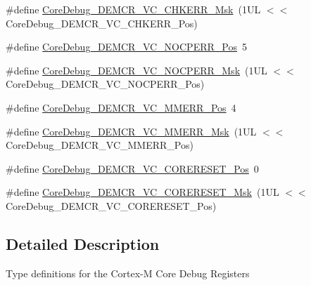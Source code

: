 \begin{DoxyCompactItemize}
\item 
\#define \hyperlink{group___c_m_s_i_s___core_debug_ga2f98b461d19746ab2febfddebb73da6f}{Core\-Debug\-\_\-\-D\-E\-M\-C\-R\-\_\-\-V\-C\-\_\-\-C\-H\-K\-E\-R\-R\-\_\-\-Msk}~(1\-U\-L $<$$<$ Core\-Debug\-\_\-\-D\-E\-M\-C\-R\-\_\-\-V\-C\-\_\-\-C\-H\-K\-E\-R\-R\-\_\-\-Pos)
\item 
\#define \hyperlink{group___c_m_s_i_s___core_debug_gac9d13eb2add61f610d5ced1f7ad2adf8}{Core\-Debug\-\_\-\-D\-E\-M\-C\-R\-\_\-\-V\-C\-\_\-\-N\-O\-C\-P\-E\-R\-R\-\_\-\-Pos}~5
\item 
\#define \hyperlink{group___c_m_s_i_s___core_debug_ga03ee58b1b02fdbf21612809034562f1c}{Core\-Debug\-\_\-\-D\-E\-M\-C\-R\-\_\-\-V\-C\-\_\-\-N\-O\-C\-P\-E\-R\-R\-\_\-\-Msk}~(1\-U\-L $<$$<$ Core\-Debug\-\_\-\-D\-E\-M\-C\-R\-\_\-\-V\-C\-\_\-\-N\-O\-C\-P\-E\-R\-R\-\_\-\-Pos)
\item 
\#define \hyperlink{group___c_m_s_i_s___core_debug_ga444454f7c7748e76cd76c3809c887c41}{Core\-Debug\-\_\-\-D\-E\-M\-C\-R\-\_\-\-V\-C\-\_\-\-M\-M\-E\-R\-R\-\_\-\-Pos}~4
\item 
\#define \hyperlink{group___c_m_s_i_s___core_debug_gad420a9b60620584faaca6289e83d3a87}{Core\-Debug\-\_\-\-D\-E\-M\-C\-R\-\_\-\-V\-C\-\_\-\-M\-M\-E\-R\-R\-\_\-\-Msk}~(1\-U\-L $<$$<$ Core\-Debug\-\_\-\-D\-E\-M\-C\-R\-\_\-\-V\-C\-\_\-\-M\-M\-E\-R\-R\-\_\-\-Pos)
\item 
\#define \hyperlink{group___c_m_s_i_s___core_debug_ga9fcf09666f7063a7303117aa32a85d5a}{Core\-Debug\-\_\-\-D\-E\-M\-C\-R\-\_\-\-V\-C\-\_\-\-C\-O\-R\-E\-R\-E\-S\-E\-T\-\_\-\-Pos}~0
\item 
\#define \hyperlink{group___c_m_s_i_s___core_debug_ga906476e53c1e1487c30f3a1181df9e30}{Core\-Debug\-\_\-\-D\-E\-M\-C\-R\-\_\-\-V\-C\-\_\-\-C\-O\-R\-E\-R\-E\-S\-E\-T\-\_\-\-Msk}~(1\-U\-L $<$$<$ Core\-Debug\-\_\-\-D\-E\-M\-C\-R\-\_\-\-V\-C\-\_\-\-C\-O\-R\-E\-R\-E\-S\-E\-T\-\_\-\-Pos)
\end{DoxyCompactItemize}


\subsection{Detailed Description}
Type definitions for the Cortex-\/\-M Core Debug Registers 

